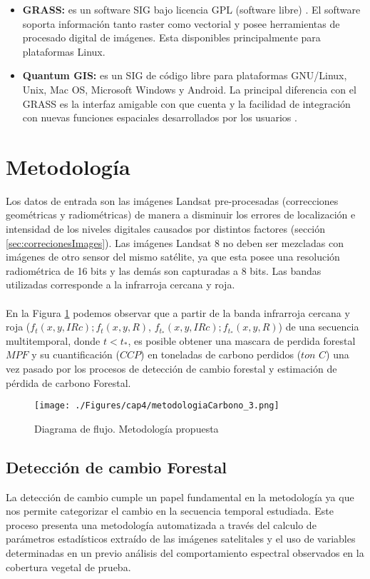 \begin{itemize}
	\item \textbf{GRASS: }es un software SIG  bajo licencia GPL (software libre) \cite{osgeoGrass}. El software soporta informaci\'on tanto raster como vectorial y posee herramientas de procesado digital de im\'agenes. Esta disponibles principalmente para plataformas Linux.
	\item \textbf{Quantum GIS: }es un SIG de c\'odigo libre para plataformas GNU/Linux, Unix, Mac OS, Microsoft Windows y Android. La principal diferencia con el GRASS es la interfaz amigable con que cuenta y la facilidad de integraci\'on con nuevas funciones espaciales desarrollados por los usuarios \cite{qgisSIG}.
\end{itemize}

\section{Metodolog\'ia}
Los datos de entrada son las im\'agenes Landsat pre-procesadas (correcciones geom\'etricas y radiom\'etricas) de manera a disminuir los errores de localizaci\'on e intensidad de los niveles digitales causados por distintos factores (secci\'on \ref{sec:correcionesImages}).  
Las im\'agenes Landsat 8 no deben ser mezcladas con im\'agenes de otro sensor del mismo sat\'elite, ya que esta posee una resoluci\'on radiom\'etrica de 16 bits y las dem\'as son capturadas a 8 bits. Las bandas utilizadas corresponde a la infrarroja cercana y roja.\\~\\
En la Figura \ref{fig:metodologiapc} podemos observar que a partir de la banda infrarroja cercana y roja ($ f_{t}(x,y,IRc);f_{t}(x,y,R) $, $ f_{t_{*}}(x,y,IRc);f_{t_{*}}(x,y,R) $) de una secuencia multitemporal, donde $ t < t_{*} $, es posible obtener una mascara de perdida forestal $ MPF $ y su cuantificaci\'on ($ CCP $) en toneladas de carbono perdidos ($ ton $ $ C $) una vez pasado por los procesos de detecci\'on de cambio forestal y estimaci\'on de p\'erdida de carbono Forestal.
\begin{figure}[H]
	\centering
	\texttt{[image: ./Figures/cap4/metodologiaCarbono\_3.png]}
	\caption{Diagrama de flujo. Metodolog\'ia propuesta}
	\label{fig:metodologiapc}
\end{figure}

\subsection{Detecci\'on de cambio Forestal}
La detecci\'on de cambio cumple un papel fundamental en la metodolog\'ia ya que nos permite categorizar el cambio en la secuencia temporal estudiada. Este proceso presenta una metodolog\'ia automatizada a trav\'es del calculo de par\'ametros estad\'isticos extra\'ido de las im\'agenes satelitales y el uso de variables determinadas en un previo an\'alisis del comportamiento espectral observados en la cobertura vegetal de prueba.

